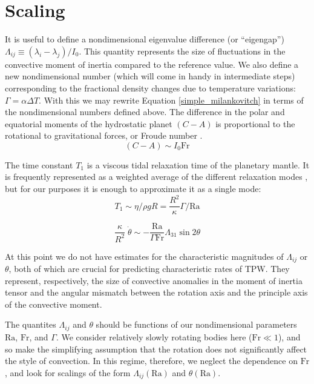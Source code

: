 \documentclass[extra,mreferee]{gji}
\begin{document}
\section{Scaling}
\label{sec:scaling}

It is useful to define a nondimensional eigenvalue difference (or ``eigengap'') $\Lambda_{ij} \equiv (\lambda_i - \lambda_j)/I_0$.  
This quantity represents the size of fluctuations in the convective moment of inertia compared to the reference value.
We also define a new nondimensional number (which will come in handy in intermediate steps) corresponding to the fractional density changes due to temperature variations: $\Gamma = \alpha \Delta T$.
With this we may rewrite Equation \ref{simple_milankovitch} in terms of the nondimensional numbers defined above.
The difference in the polar and equatorial moments of the hydrostatic planet $(C-A)$ is proportional to the rotational to gravitational forces, or Froude number \citep[e.g.][]{??}.
\begin{equation}
(C-A) \sim I_0 \mathrm{Fr}
\end{equation}

The time constant $T_1$ is a viscous tidal relaxation time of the planetary mantle. It is frequently represented as a weighted average of the different relaxation modes \citep[e.g.][]{ricard1993polar, greff2004upwelling}, but for our purposes it is enough to approximate it as a single mode:
\begin{equation}
T_1 \sim \eta / \rho g R = \frac{R^2}{\kappa} \Gamma/\mathrm{Ra}
\end{equation}

\begin{equation}
\frac{\kappa}{R^2} \; \dot{\theta} \sim - \frac{\mathrm{Ra}}{\Gamma \mathrm{Fr}} \Lambda_{31} \sin{2 \theta}
\label{scaled_rotation}
\end{equation}

At this point we do not have estimates for the characteristic magnitudes of $\Lambda_{ij}$ or $\theta$, both of which are crucial for predicting characteristic rates of TPW.
They represent, respectively, the size of convective anomalies in the moment of inertia tensor and the angular mismatch between the rotation axis and the principle axis of the convective moment.


The quantites $\Lambda_{ij}$ and $\theta$ should be functions of our nondimensional parameters $\mathrm{Ra}$, $\mathrm{Fr}$, and $\Gamma$.  
We consider relatively slowly rotating bodies here ($\mathrm{Fr} \ll 1$), and so make the simplifying assumption that the rotation does not significantly affect the style of convection.  
In this regime, therefore, we neglect the dependence on $\mathrm{Fr}$, and look for scalings of the form $\Lambda_{ij}(\mathrm{Ra})$ and $\theta(\mathrm{Ra})$.
\end{document}
